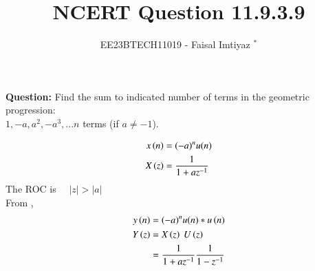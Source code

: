 \documentclass[journal,12pt,twocolumn]{IEEEtran}
\theoremstyle{remark}
\begin{document}

\vspace{3cm}
\title{NCERT Question 11.9.3.9}
\author{EE23BTECH11019 - Faisal Imtiyaz $^{*}$%
}
\maketitle
\newpage
\bigskip

\renewcommand{\thefigure}{\arabic{figure}}
\renewcommand{\thetable}{\arabic{table}}


\vspace{3cm}
\textbf{Question:} Find the sum to indicated number of terms in the geometric progression:\\
$1,-a, a^2, -a^3,...n$ terms (if $a\neq-1$).\\
\solution


\begin{align}
x\left(n\right) &= (-a)^{n}u(n)\\
X\left(z\right) &=  \frac{1}{1+az^{-1}}
\end{align}
The ROC is $ \quad |z| > |a|$\\
From ,
\begin{align}
y\left(n\right) &={(-a)^n}u(n)*u\left(n\right)\\
Y\left(z\right) &= X\left(z\right)\ U\left(z\right)\\
&=\frac{1}{1+az^{-1}}\frac{1}{1-z^{-1}}
\end{align}
\end{document}
